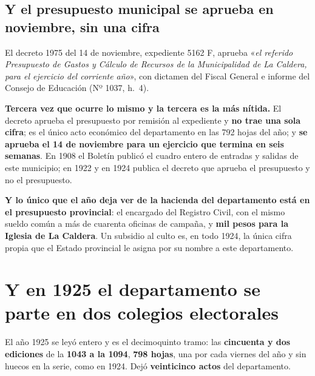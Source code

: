 \subsection*{Y el presupuesto municipal se aprueba en noviembre, sin una cifra}

El decreto 1975 del 14 de noviembre, expediente 5162 F, aprueba «\textit{el referido Presupuesto
de Gastos y Cálculo de Recursos de la Municipalidad de La Caldera, para el ejercicio del
corriente año}», con dictamen del Fiscal General e informe del Consejo de Educación (Nº 1037,
h.\ 4).

\begin{cautela}
\textbf{Tercera vez que ocurre lo mismo y la tercera es la más nítida.} El decreto aprueba el
presupuesto por remisión al expediente y \textbf{no trae una sola cifra}; es el único acto
económico del departamento en las 792 hojas del año; y \textbf{se aprueba el 14 de noviembre para
un ejercicio que termina en seis semanas}. En 1908 el Boletín publicó el cuadro entero de
entradas y salidas de este municipio; en 1922 y en 1924 publica el decreto que aprueba el
presupuesto y no el presupuesto.

\textbf{Y lo único que el año deja ver de la hacienda del departamento está en el presupuesto
provincial}: el encargado del Registro Civil, con el mismo sueldo común a más de cuarenta
oficinas de campaña, y \textbf{mil pesos para la Iglesia de La Caldera}. Un subsidio al culto es,
en todo 1924, la única cifra propia que el Estado provincial le asigna por su nombre a este
departamento.
\end{cautela}

\section{Y en 1925 el departamento se parte en dos colegios electorales}

El año 1925 se leyó entero y es el decimoquinto tramo: las \textbf{cincuenta y dos ediciones} de
la \textbf{1043 a la 1094}, \textbf{798 hojas}, una por cada viernes del año y sin huecos en la
serie, como en 1924. Dejó \textbf{veinticinco actos} del departamento.

